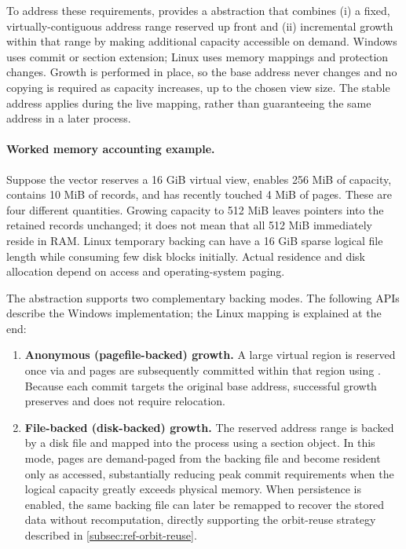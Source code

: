 To address these requirements, \FractalShark{} provides a
 abstraction that combines (i) a fixed,
virtually-contiguous address range reserved up front and (ii) incremental growth
within that range by making additional capacity accessible on demand. Windows uses
commit or section extension; Linux uses memory mappings and protection changes.
Growth is performed
in place, so the base address never changes and no copying is required as
capacity increases, up to the chosen view size. The stable address applies during
the live mapping, rather than guaranteeing the same address in a later process.

\paragraph{Worked memory accounting example.}
Suppose the vector reserves a 16 GiB virtual view, enables 256 MiB of capacity,
contains 10 MiB of records, and has recently touched 4 MiB of pages. These are four
different quantities. Growing capacity to 512 MiB leaves pointers into the retained
records unchanged; it does not mean that all 512 MiB immediately reside in RAM.
Linux temporary backing can have a 16 GiB sparse logical file length while consuming
few disk blocks initially. Actual residence and disk allocation depend on access
and operating-system paging.

The abstraction supports two complementary backing modes. The following APIs
describe the Windows implementation; the Linux mapping is explained at the end:

\begin{enumerate}
  \item \textbf{Anonymous (pagefile-backed) growth.} A large virtual region is
  reserved once via  and pages are
  subsequently committed within that region using
  . Because each commit
  targets the original base address, successful growth preserves
   and does not require relocation.

  \item \textbf{File-backed (disk-backed) growth.} The reserved address range is
  backed by a disk file and mapped into the process using a section object. In
  this mode, pages are demand-paged from the backing file and become resident
  only as accessed, substantially reducing peak commit requirements when the
  logical capacity greatly exceeds physical memory. When persistence is enabled,
  the same backing file can later be remapped to recover the stored data without
  recomputation, directly supporting the orbit-reuse strategy described in \cref{subsec:ref-orbit-reuse}.
\end{enumerate}

